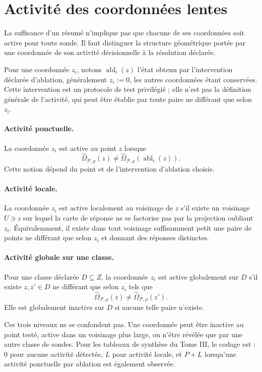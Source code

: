 \section{Activité des coordonnées lentes}
\label{annexe-I-activite}

La suffisance d'un résumé n'implique pas que chacune de ses coordonnées
soit active pour toute sonde. Il faut distinguer la structure
géométrique portée par une coordonnée de son activité décisionnelle à la
résolution déclarée.

Pour une coordonnée $z_i$, notons $\operatorname{abl}_i(z)$ l'état obtenu
par l'intervention déclarée d'ablation, généralement $z_i:=0$, les autres
coordonnées étant conservées. Cette intervention est un protocole de
test privilégié ; elle n'est pas la définition générale de l'activité,
qui peut être établie par toute paire ne différant que selon $z_i$.

\paragraph{Activité ponctuelle.}
La coordonnée $z_i$ est active au point $z$ lorsque
\[
\widehat\Omega_{\mathcal P,\rho}(z)
\ne
\widehat\Omega_{\mathcal P,\rho}(\operatorname{abl}_i(z)).
\]
Cette notion dépend du point et de l'intervention d'ablation choisie.

\paragraph{Activité locale.}
La coordonnée $z_i$ est active localement au voisinage de $z$ s'il existe
un voisinage $U\ni z$ sur lequel la carte de réponse ne se factorise pas
par la projection oubliant $z_i$. Équivalemment, il existe dans tout
voisinage suffisamment petit une paire de points ne différant que selon
$z_i$ et donnant des réponses distinctes.

\paragraph{Activité globale sur une classe.}
Pour une classe déclarée $D\subseteq Z$, la coordonnée $z_i$ est active
globalement sur $D$ s'il existe $z,z'\in D$ ne différant que selon
$z_i$ tels que
\[
\widehat\Omega_{\mathcal P,\rho}(z)
\ne
\widehat\Omega_{\mathcal P,\rho}(z').
\]
Elle est globalement inactive sur $D$ si aucune telle paire n'existe.

Ces trois niveaux ne se confondent pas. Une coordonnée peut être inactive
au point testé, active dans un voisinage plus large, ou n'être révélée
que par une autre classe de sondes. Pour les tableaux de synthèse du
Tome III, le codage est : $0$ pour aucune activité détectée, $L$ pour
activité locale, et $P+L$ lorsqu'une activité ponctuelle par ablation est
également observée.

